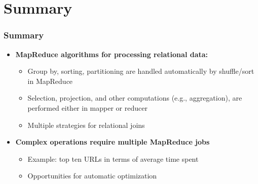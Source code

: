 \documentclass{beamer}
\newcommand{\bi}{\begin{itemize}}
\newcommand{\ei}{\end{itemize}}
\newcommand{\ii}{\item}
\begin{document}

\section{Summary} 


\begin{frame}
\frametitle{Summary}

\bi
\ii \textbf{MapReduce algorithms for processing relational data:}
\bi
\ii Group by, sorting, partitioning are handled automatically by shuffle/sort in MapReduce
\ii Selection, projection, and other computations (e.g., aggregation), are performed either in mapper or reducer
\ii Multiple strategies for relational joins
\ei
\ei

\bi
\ii \textbf{Complex operations require multiple MapReduce jobs}
\bi
\ii Example: top ten URLs in terms of average time spent
\ii Opportunities for automatic optimization
\ei
\ei

\end{frame}

\end{document}
